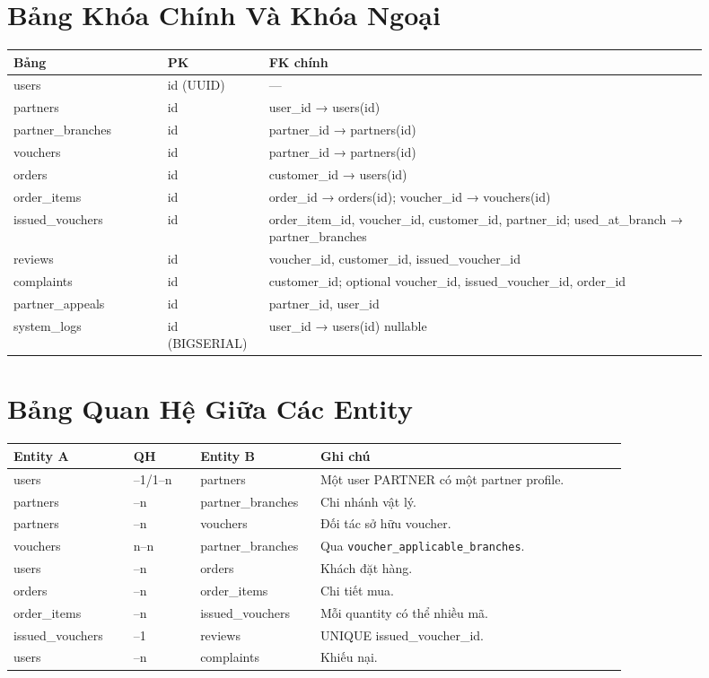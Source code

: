 \section{Bảng Khóa Chính Và Khóa Ngoại}
\small
\begin{longtable}{>{\raggedright\arraybackslash}p{0.20\linewidth}>{\raggedright\arraybackslash}p{0.12\linewidth}>{\raggedright\arraybackslash}p{0.58\linewidth}}
\toprule
\textbf{Bảng} & \textbf{PK} & \textbf{FK chính}\\
\midrule
\endhead
users & id (UUID) & —\\
partners & id & user\_id → users(id)\\
partner\_branches & id & partner\_id → partners(id)\\
vouchers & id & partner\_id → partners(id)\\
orders & id & customer\_id → users(id)\\
order\_items & id & order\_id → orders(id); voucher\_id → vouchers(id)\\
issued\_vouchers & id & order\_item\_id, voucher\_id, customer\_id, partner\_id; used\_at\_branch → partner\_branches\\
reviews & id & voucher\_id, customer\_id, issued\_voucher\_id\\
complaints & id & customer\_id; optional voucher\_id, issued\_voucher\_id, order\_id\\
partner\_appeals & id & partner\_id, user\_id\\
system\_logs & id (BIGSERIAL) & user\_id → users(id) nullable\\
\bottomrule
\end{longtable}
\normalsize

\section{Bảng Quan Hệ Giữa Các Entity}
\begin{longtable}{>{\raggedright\arraybackslash}p{0.18\linewidth}>{\raggedright\arraybackslash}p{0.10\linewidth}>{\raggedright\arraybackslash}p{0.18\linewidth}>{\raggedright\arraybackslash}p{0.46\linewidth}}
\toprule
\textbf{Entity A} & \textbf{QH} & \textbf{Entity B} & \textbf{Ghi chú}\\
\midrule
users & 1--1/1--n & partners & Một user PARTNER có một partner profile.\\
partners & 1--n & partner\_branches & Chi nhánh vật lý.\\
partners & 1--n & vouchers & Đối tác sở hữu voucher.\\
vouchers & n--n & partner\_branches & Qua \texttt{voucher\_applicable\_branches}.\\
users & 1--n & orders & Khách đặt hàng.\\
orders & 1--n & order\_items & Chi tiết mua.\\
order\_items & 1--n & issued\_vouchers & Mỗi quantity có thể nhiều mã.\\
issued\_vouchers & 1--1 & reviews & UNIQUE issued\_voucher\_id.\\
users & 1--n & complaints & Khiếu nại.\\
\bottomrule
\end{longtable}

